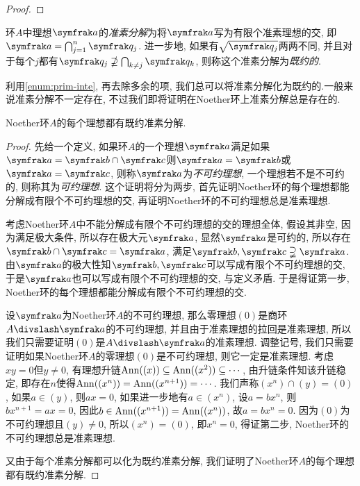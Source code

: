 \begin{proof}
\end{proof}

\begin{definition}
  环$A$中理想$\ideal{a}$的\emph{准素分解}为将$\ideal{a}$写为有限个准素理想的交, 即$\ideal{a}=\bigcap_{j=1}^n\ideal{q}_j$. 进一步地, 如果有$\sqrt{\ideal{q}_j}$两两不同, 并且对于每个$j$都有$\ideal{q}_j\nsupseteq\bigcap_{k\neq j}\ideal{q}_k$, 则称这个准素分解为\emph{既约的}.
\end{definition}

利用\ref{enum:prim-inte}, 再去除多余的项, 我们总可以将准素分解化为既约的.一般来说准素分解不一定存在, 不过我们即将证明在Noether环上准素分解总是存在的.

\begin{theorem}\label{thm:laskernoether}
  Noether环$A$的每个理想都有既约准素分解.
\end{theorem}

\begin{proof}
  先给一个定义, 如果环$A$的一个理想$\ideal{a}$满足如果$\ideal{a}=\ideal{b}\cap\ideal{c}$则$\ideal{a}=\ideal{b}$或$\ideal{a}=\ideal{c}$, 则称$\ideal{a}$为\emph{不可约理想}, 一个理想若不是不可约的, 则称其为\emph{可约理想}. 这个证明将分为两步, 首先证明Noether环的每个理想都能分解成有限个不可约理想的交, 再证明Noether环的不可约理想总是准素理想.

  考虑Noether环$A$中不能分解成有限个不可约理想的交的理想全体, 假设其非空, 因为满足极大条件, 所以存在极大元$\ideal{a}$, 显然$\ideal{a}$是可约的, 所以存在$\ideal{b}\cap\ideal{c}=\ideal{a}$, 满足$\ideal{b}, \ideal{c}\supsetneqq\ideal{a}$. 由$\ideal{a}$的极大性知$\ideal{b}, \ideal{c}$可以写成有限个不可约理想的交, 于是$\ideal{a}$也可以写成有限个不可约理想的交, 与定义矛盾. 于是得证第一步, Noether环的每个理想都能分解成有限个不可约理想的交.

  设$\ideal{a}$为Noether环$A$的不可约理想, 那么零理想$(0)$是商环$A{\divslash}\ideal{a}$的不可约理想, 并且由于准素理想的拉回是准素理想, 所以我们只需要证明$(0)$是$A{\divslash}\ideal{a}$的准素理想. 调整记号, 我们只需要证明如果Noether环$A$的零理想$(0)$是不可约理想, 则它一定是准素理想. 考虑$xy=0$但$y\neq 0$, 有理想升链$\operatorname{Ann}((x))\subseteq\operatorname{Ann}((x^2))\subseteq\dotsb$, 由升链条件知该升链稳定, 即存在$n$使得$\operatorname{Ann}((x^n))=\operatorname{Ann}((x^{n+1}))=\dotsb$. 我们声称$(x^n)\cap (y)=(0)$, 如果$a\in (y)$, 则$ax=0$, 如果进一步地有$a\in (x^n)$, 设$a=bx^n$, 则$bx^{n+1}=ax=0$, 因此$b\in\operatorname{Ann}((x^{n+1}))=\operatorname{Ann}((x^n))$, 故$a=bx^n=0$. 因为$(0)$为不可约理想且$(y)\neq 0$, 所以$(x^n)=(0)$, 即$x^n=0$, 得证第二步, Noether环的不可约理想总是准素理想.

  又由于每个准素分解都可以化为既约准素分解, 我们证明了Noether环$A$的每个理想都有既约准素分解.
\end{proof}

